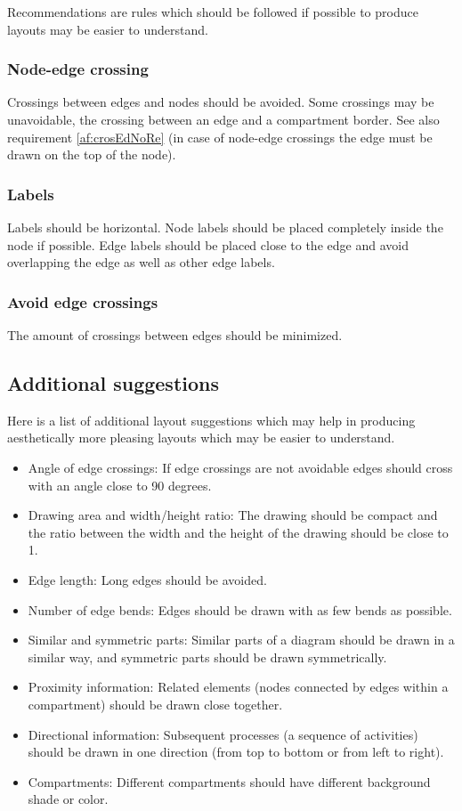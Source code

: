 Recommendations are rules which should be followed if possible to
produce layouts may be easier to understand.

\subsubsection{Node-edge crossing}
\label{af:crosEdNo}

Crossings between edges and nodes should be avoided. Some crossings
may be unavoidable, \eg the crossing between an edge and a
compartment border. See also
requirement \ref{af:crosEdNoRe} (in case of node-edge crossings the
edge must be drawn on the top of the node).

\subsubsection{Labels}

Labels should be horizontal. Node labels should be placed completely
inside the node if possible. Edge labels should be placed close to
the edge and avoid overlapping the edge as well as other edge
labels.

\subsubsection{Avoid edge crossings}

The amount of crossings between edges should be minimized.

\subsection{Additional suggestions}

Here is a list of additional layout suggestions which may help in
producing aesthetically more pleasing layouts which may be easier to
understand.

\begin{itemize}
  \item Angle of edge crossings: If edge crossings are not avoidable
  edges should cross with an angle close to 90 degrees.
  \item Drawing area and width/height ratio: The drawing should
  be compact and the ratio between the width and the height
  of the drawing should be close to 1.
  \item Edge length: Long edges should be avoided.
  \item Number of edge bends: Edges should be drawn with
  as few bends as possible.
  \item Similar and symmetric parts: Similar parts of a diagram
  should be drawn in a similar way, and symmetric parts
  should be drawn symmetrically.
  \item Proximity information: Related elements (\eg nodes
  connected by edges within a compartment)
  should be drawn close together.
  \item Directional information: Subsequent processes (\eg a sequence
  of activities) should be drawn in one direction (\eg from
  top to bottom or from left to right).
  \item Compartments: Different compartments should have different
  background shade or color.
\end{itemize}
